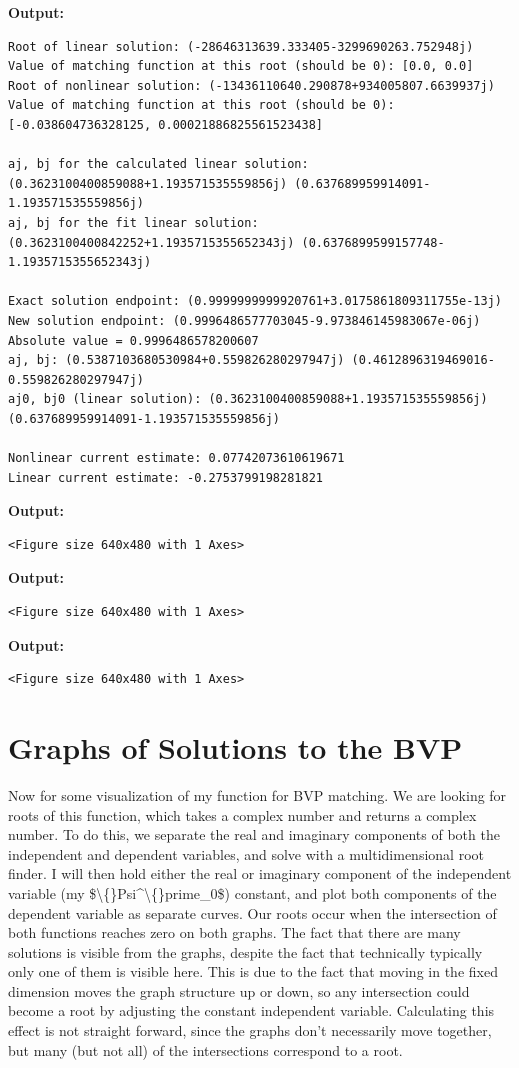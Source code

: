 \documentclass{article}
\begin{document}
\textbf{Output:}\begin{verbatim}
Root of linear solution: (-28646313639.333405-3299690263.752948j)
Value of matching function at this root (should be 0): [0.0, 0.0]
Root of nonlinear solution: (-13436110640.290878+934005807.6639937j)
Value of matching function at this root (should be 0): [-0.038604736328125, 0.00021886825561523438]

aj, bj for the calculated linear solution:  (0.3623100400859088+1.193571535559856j) (0.637689959914091-1.193571535559856j)
aj, bj for the fit linear solution:  (0.3623100400842252+1.1935715355652343j) (0.6376899599157748-1.1935715355652343j)

Exact solution endpoint: (0.9999999999920761+3.0175861809311755e-13j)
New solution endpoint: (0.9996486577703045-9.973846145983067e-06j) Absolute value = 0.9996486578200607
aj, bj: (0.5387103680530984+0.559826280297947j) (0.4612896319469016-0.559826280297947j)
aj0, bj0 (linear solution): (0.3623100400859088+1.193571535559856j) (0.637689959914091-1.193571535559856j)

Nonlinear current estimate: 0.07742073610619671
Linear current estimate: -0.2753799198281821

\end{verbatim}

\textbf{Output:}\begin{verbatim}
<Figure size 640x480 with 1 Axes>
\end{verbatim}

\textbf{Output:}\begin{verbatim}
<Figure size 640x480 with 1 Axes>
\end{verbatim}

\textbf{Output:}\begin{verbatim}
<Figure size 640x480 with 1 Axes>
\end{verbatim}

\section{Graphs of Solutions to the BVP}

Now for some visualization of my function for BVP matching. We are looking for roots of this function, which takes a complex number and returns a complex number. To do this, we separate the real and imaginary components of both the independent and dependent variables, and solve with a multidimensional root finder. I will then hold either the real or imaginary component of the independent variable (my \$\textbackslash\{\}Psi\textasciicircum{}\textbackslash\{\}prime\_0\$) constant, and plot both components of the dependent variable as separate curves. Our roots occur when the intersection of both functions reaches zero on both graphs. The fact that there are many solutions is visible from the graphs, despite the fact that technically typically only one of them is visible here. This is due to the fact that moving in the fixed dimension moves the graph structure up or down, so any intersection could become a root by adjusting the constant independent variable. Calculating this effect is not straight forward, since the graphs don't necessarily move together, but many (but not all) of the intersections correspond to a root.
\end{document}
